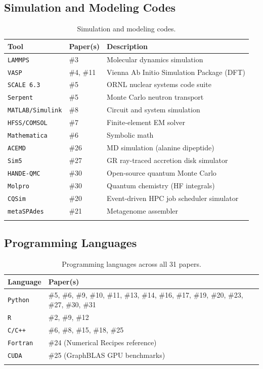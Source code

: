 \documentclass[11pt,letterpaper]{article}
\newcommand{\tool}[1]{\texttt{#1}}
\begin{document}
\subsection{Simulation and Modeling Codes}

\begin{longtable}{l l p{6.5cm}}
\toprule
\textbf{Tool} & \textbf{Paper(s)} & \textbf{Description} \\
\midrule
\tool{LAMMPS}         & \#3        & Molecular dynamics simulation \\
\tool{VASP}           & \#4, \#11  & Vienna Ab Initio Simulation Package (DFT) \\
\tool{SCALE 6.3}      & \#5        & ORNL nuclear systems code suite \\
\tool{Serpent}         & \#5        & Monte Carlo neutron transport \\
\tool{MATLAB/Simulink} & \#8       & Circuit and system simulation \\
\tool{HFSS/COMSOL}    & \#7        & Finite-element EM solver \\
\tool{Mathematica}     & \#6       & Symbolic math \\
\tool{ACEMD}           & \#26      & MD simulation (alanine dipeptide) \\
\tool{Sim5}            & \#27      & GR ray-traced accretion disk simulator \\
\tool{HANDE-QMC}       & \#30      & Open-source quantum Monte Carlo \\
\tool{Molpro}          & \#30      & Quantum chemistry (HF integrals) \\
\tool{CQSim}           & \#20      & Event-driven HPC job scheduler simulator \\
\tool{metaSPAdes}      & \#21      & Metagenome assembler \\
\bottomrule
\caption{Simulation and modeling codes.}
\end{longtable}

\subsection{Programming Languages}

\begin{longtable}{l p{10cm}}
\toprule
\textbf{Language} & \textbf{Paper(s)} \\
\midrule
\tool{Python}  & \#5, \#6, \#9, \#10, \#11, \#13, \#14, \#16, \#17, \#19, \#20, \#23, \#27, \#30, \#31 \\
\tool{R}       & \#2, \#9, \#12 \\
\tool{C/C++}   & \#6, \#8, \#15, \#18, \#25 \\
\tool{Fortran} & \#24 (Numerical Recipes reference) \\
\tool{CUDA}    & \#25 (GraphBLAS GPU benchmarks) \\
\bottomrule
\caption{Programming languages across all 31 papers.}
\end{longtable}
\end{document}
